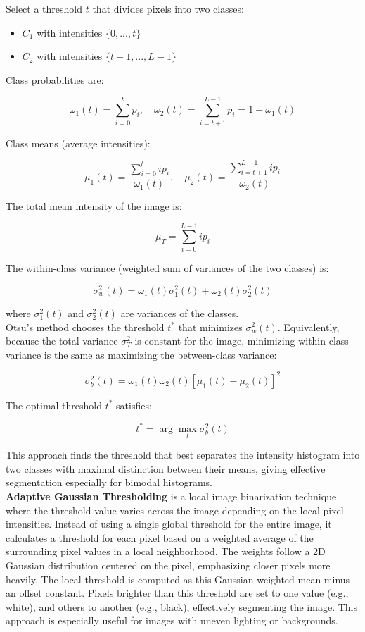 \documentclass{article}
\begin{document}
	Select a threshold \( t \) that divides pixels into two classes:
	
	\begin{itemize}
		\item \( C_1 \) with intensities \(\{0, ..., t\}\)
		\item \( C_2 \) with intensities \(\{t + 1, ..., L - 1\}\)
	\end{itemize}
	
	Class probabilities are:
	
	\[
	\omega_1(t) = \sum_{i=0}^t p_i, \quad \omega_2(t) = \sum_{i=t+1}^{L-1} p_i = 1 - \omega_1(t)
	\]
	
	Class means (average intensities):
	
	\[
	\mu_1(t) = \frac{\sum_{i=0}^t i p_i}{\omega_1(t)}, \quad \mu_2(t) = \frac{\sum_{i=t+1}^{L-1} i p_i}{\omega_2(t)}
	\]
	
	The total mean intensity of the image is:
	
	\[
	\mu_T = \sum_{i=0}^{L-1} i p_i
	\]
	
	The within-class variance (weighted sum of variances of the two classes) is:
	
	\[
	\sigma_w^2(t) = \omega_1(t) \sigma_1^2(t) + \omega_2(t) \sigma_2^2(t)
	\]
	
	where \(\sigma_1^2(t)\) and \(\sigma_2^2(t)\) are variances of the classes.\\
	
	Otsu's method chooses the threshold \( t^* \) that minimizes \(\sigma_w^2(t)\). Equivalently, because the total variance \(\sigma_T^2\) is constant for the image, minimizing within-class variance is the same as maximizing the between-class variance:
	
	\[
	\sigma_b^2(t) = \omega_1(t) \omega_2(t) [\mu_1(t) - \mu_2(t)]^2
	\]
	
	The optimal threshold \( t^* \) satisfies:
	
	\[
	t^* = \arg \max_t \sigma_b^2(t)
	\]
	
	This approach finds the threshold that best separates the intensity histogram into two classes with maximal distinction between their means, giving effective segmentation especially for bimodal histograms.\\
	
	\textbf{Adaptive Gaussian Thresholding} is a local image binarization technique where the threshold value varies across the image depending on the local pixel intensities. Instead of using a single global threshold for the entire image, it calculates a threshold for each pixel based on a weighted average of the surrounding pixel values in a local neighborhood. The weights follow a 2D Gaussian distribution centered on the pixel, emphasizing closer pixels more heavily. The local threshold is computed as this Gaussian-weighted mean minus an offset constant. Pixels brighter than this threshold are set to one value (e.g., white), and others to another (e.g., black), effectively segmenting the image. This approach is especially useful for images with uneven lighting or backgrounds.\\
	
\end{document}
